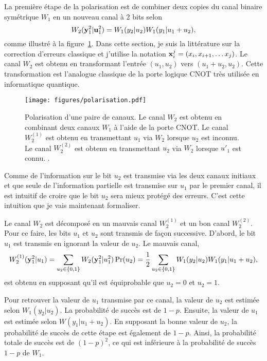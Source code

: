 La première étape de la polarisation est de combiner 
deux copies du canal binaire symétrique $W_1$ en un nouveau canal à 2 bits selon 
\begin{equation}
  W_2(\vb y_1^2 | \vb u_1^2) = W_1(y_2 | u_2) W_1(y_1 | u_1 + u_2),
\end{equation}
comme illustré à la figure~\ref{fig:polarisation}.
Dans cette section, je suis la littérature sur la correction d'erreurs
classique et j'utilise la notation $\vb x_i^j = (x_i, x_{i + 1}, \ldots x_j)$.
Le canal $W_2$ est obtenu en transformant l'entrée $(u_1, u_2)$ vers $(u_1 + u_2, u_2)$.
Cette transformation est l'analogue classique de la porte logique CNOT très utilisée 
en informatique quantique.

\begin{figure}[t]
  \begin{center}
    \texttt{[image: figures/polarisation.pdf]}
  \end{center}
  \caption[Polarisation des canaux]{
    Polarisation d'une paire de canaux.
    Le canal $W_2$ est obtenu en combinant deux canaux $W_1$ à l'aide de la porte CNOT.
    Le canal $W_2^{(1)}$ est obtenu en transmettant $u_1$ via $W_2$ lorsque $u_2$ est inconnu.
    Le canal $W_2^{(2)}$ est obtenu en transmettant $u_2$ via $W_2$ lorsque $u'_1$ est connu.
.  }
  \label{fig:polarisation}
\end{figure}

Comme de l'information sur le bit $u_2$ est transmise via les deux canaux initiaux et 
que seule de l'information partielle est transmise sur $u_1$ par le premier canal,
il est intuitif de croire que le bit $u_2$ sera mieux protégé des erreurs. 
C'est cette intuition que je vais maintenant formaliser.

Le canal $W_2$ est décomposé en un mauvais canal $W_2^{(1)}$ et un bon canal $W_2^{(2)}$.
Pour ce faire,
les bits $u_1$ et $u_2$ sont transmis de façon successive.
D'abord, 
le bit $u_1$ est transmis en ignorant la valeur de $u_2$. 
Le mauvais canal,
\begin{equation}
  W_2^{(1)}(\vb y_1^2 | u_1) 
  = \sum_{u_2 \in \qty{0, 1}} W_2(\vb y_1^2 | u_1^2) \Pr(u_2)
  = \frac{1}{2}\sum_{u_2 \in \qty{0, 1}} W_1(y_2 | u_2) W_1(y_1 | u_1 + u_2),
\end{equation}
est obtenu en supposant qu'il est équiprobable que $u_2 = 0$ et $u_2 = 1$.

Pour retrouver la valeur de $u_1$ transmise par ce canal, 
la valeur de $u_2$ est estimée selon $W_1(y_2 | u_2)$. 
La probabilité de succès est de $1 - p$. 
Ensuite, 
la valeur de $u_1$ est estimée selon $W(y_1 | u_1 + u_2)$.
En supposant la bonne valeur de $u_2$, 
la probabilité de succès de cette étape est également de $1 - p$.
Ainsi, la probabilité totale de succès est de $(1 - p)^2$,
ce qui est inférieure à la probabilité de succès $1 - p$ de $W_1$.

